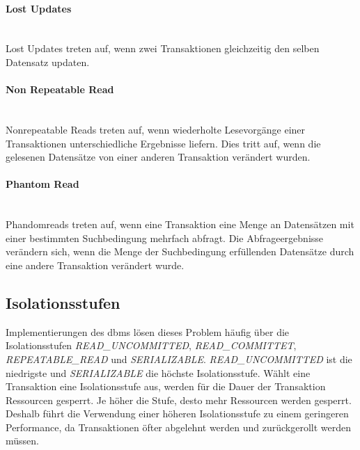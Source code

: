 \paragraph*{Lost Updates} \mbox{} \\
Lost Updates treten auf, wenn zwei Transaktionen gleichzeitig den selben Datensatz updaten\cite{IBMDocumentation.2021}.

\paragraph*{Non Repeatable Read} \mbox{} \\
Nonrepeatable Reads treten auf, wenn wiederholte Lesevorgänge einer Transaktionen unterschiedliche Ergebnisse liefern. Dies tritt auf, wenn die gelesenen Datensätze von einer anderen Transaktion verändert wurden\cite{IBMDocumentation.2021, PostgreSQLDocumentation.2023}.

\paragraph*{Phantom Read} \mbox{} \\
Phandomreads treten auf, wenn eine Transaktion eine Menge an Datensätzen mit einer bestimmten Suchbedingung mehrfach abfragt. Die Abfrageergebnisse verändern sich, wenn die Menge der Suchbedingung erfüllenden Datensätze durch eine andere Transaktion verändert wurde\cite{PostgreSQLDocumentation.2023}. 

\subsection{Isolationsstufen}
Implementierungen des \acrshort{dbms} lösen dieses Problem häufig über die Isolationsstufen \textit{READ\_UNCOMMITTED}, \textit{READ\_COMMITTET}, \textit{REPEATABLE\_READ} und \textit{SERIALIZABLE}. \textit{READ\_UNCOMMITTED} ist die niedrigste und \textit{SERIALIZABLE} die höchste Isolationsstufe. Wählt eine Transaktion eine Isolationsstufe aus, werden für die Dauer der Transaktion Ressourcen gesperrt. Je höher die Stufe, desto mehr Ressourcen werden gesperrt. Deshalb führt die Verwendung einer höheren Isolationsstufe zu einem geringeren Performance, da Transaktionen öfter abgelehnt werden und zurückgerollt werden müssen\cite{Zeleny.20220601}. 
